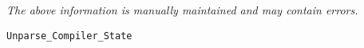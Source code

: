 \label{pkg:unparse\_compiler\_state}

{\tiny \it The above information is manually maintained and may contain errors.}
\begin{verbatim}
Unparse_Compiler_State
\end{verbatim}
